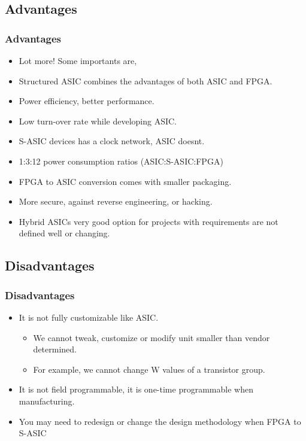 \documentclass{beamer}
\begin{document}
\subsection{Advantages}
\frame
{
  \frametitle{Advantages}
  \begin{itemize}
  \item Lot more! Some importants are,
  \item Structured ASIC combines the advantages of both ASIC and FPGA.
  \item Power efficiency, better performance.
  \item Low turn-over rate while developing ASIC.
  \item S-ASIC devices has a clock network, ASIC doesnt.
  \item 1:3:12 power consumption ratios (ASIC:S-ASIC:FPGA)
  \item FPGA to ASIC conversion comes with smaller packaging.
  \item More secure, against reverse engineering, or hacking.
  \item Hybrid ASICs very good option for projects with requirements are not defined well or changing.
  \end{itemize}
}

\subsection{Disadvantages}
\frame
{
  \frametitle{Disadvantages}

  \begin{itemize}
  \item It is not fully customizable like ASIC.
  \begin{itemize}
  \item We cannot tweak, customize or modify unit smaller than vendor determined.
  \item For example, we cannot change W values of a transistor group. 
  \end{itemize}
  \item It is not field programmable, it is one-time programmable when manufacturing. 
  \item You may need to redesign or change the design methodology when FPGA to S-ASIC
  \end{itemize}
}
\end{document}
